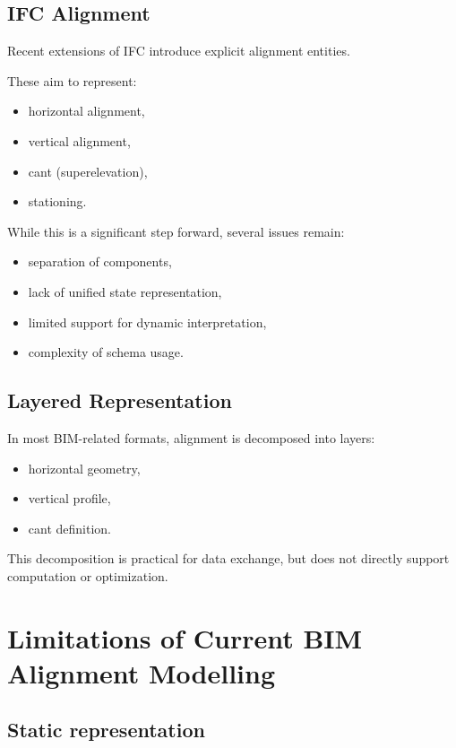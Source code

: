 \subsection{IFC Alignment}

Recent extensions of IFC introduce explicit alignment entities.

These aim to represent:
\begin{itemize}
\item horizontal alignment,
\item vertical alignment,
\item cant (superelevation),
\item stationing.
\end{itemize}

While this is a significant step forward, several issues remain:
\begin{itemize}
\item separation of components,
\item lack of unified state representation,
\item limited support for dynamic interpretation,
\item complexity of schema usage.
\end{itemize}


\subsection{Layered Representation}

In most BIM-related formats, alignment is decomposed into layers:
\begin{itemize}
\item horizontal geometry,
\item vertical profile,
\item cant definition.
\end{itemize}

This decomposition is practical for data exchange, but does not directly
support computation or optimization.


\section{Limitations of Current BIM Alignment Modelling}

\subsection{Static representation}


